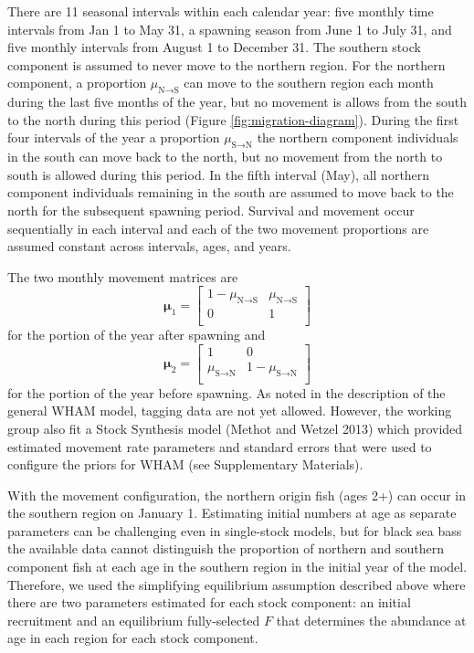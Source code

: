 \documentclass[
]{article}
\begin{document}
There are 11 seasonal intervals within each calendar year: five monthly
time intervals from Jan 1 to May 31, a spawning season from June 1 to
July 31, and five monthly intervals from August 1 to December 31. The
southern stock component is assumed to never move to the northern
region. For the northern component, a proportion
\(\mu_{\text{N}\rightarrow \text{S}}\) can move to the southern region
each month during the last five months of the year, but no movement is
allows from the south to the north during this period (Figure
\ref{fig:migration-diagram}). During the first four intervals of the
year a proportion \(\mu_{\text{S}\rightarrow \text{N}}\) the northern
component individuals in the south can move back to the north, but no
movement from the north to south is allowed during this period. In the
fifth interval (May), all northern component individuals remaining in
the south are assumed to move back to the north for the subsequent
spawning period. Survival and movement occur sequentially in each
interval and each of the two movement proportions are assumed constant
across intervals, ages, and years.

The two monthly movement matrices are \begin{equation*}
\boldsymbol{\mu}_{1} = 
  \begin{bmatrix}
     1-\mu_{\text{N}\rightarrow \text{S}} & \mu_{\text{N}\rightarrow \text{S}} \\
     0 & 1 \\
  \end{bmatrix}
\end{equation*} for the portion of the year after spawning and
\begin{equation*}
\boldsymbol{\mu}_{2} = 
  \begin{bmatrix}
     1 &  0 \\
     \mu_{\text{S}\rightarrow \text{N}} & 1-\mu_{\text{S}\rightarrow \text{N}} \\
  \end{bmatrix}
\end{equation*} for the portion of the year before spawning. As noted in
the description of the general WHAM model, tagging data are not yet
allowed. However, the working group also fit a Stock Synthesis model
(Methot and Wetzel 2013) which provided estimated movement rate
parameters and standard errors that were used to configure the priors
for WHAM (see Supplementary Materials).

With the movement configuration, the northern origin fish (ages 2+) can
occur in the southern region on January 1. Estimating initial numbers at
age as separate parameters can be challenging even in single-stock
models, but for black sea bass the available data cannot distinguish the
proportion of northern and southern component fish at each age in the
southern region in the initial year of the model. Therefore, we used the
simplifying equilibrium assumption described above where there are two
parameters estimated for each stock component: an initial recruitment
and an equilibrium fully-selected \(F\) that determines the abundance at
age in each region for each stock component.
\end{document}
